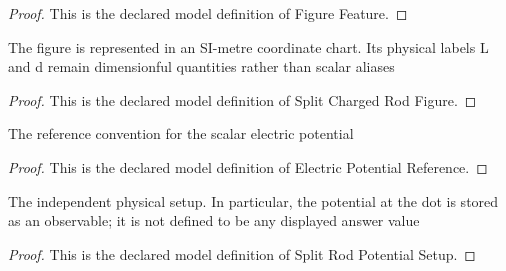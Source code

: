 \begin{proof}
  This is the declared model definition of Figure Feature.
\end{proof}
\begin{definition}
  \label{def:physics:phyx-mini-0863:phyxminiproblems-problemphyxmini0863-splitchargedrodfigure}
  The figure is represented in an SI-metre coordinate chart. Its physical labels L and d remain dimensionful quantities rather than scalar aliases
\end{definition}
\begin{proof}
  This is the declared model definition of Split Charged Rod Figure.
\end{proof}
\begin{definition}
  \label{def:physics:phyx-mini-0863:phyxminiproblems-problemphyxmini0863-electricpotentialreference}
  The reference convention for the scalar electric potential
\end{definition}
\begin{proof}
  This is the declared model definition of Electric Potential Reference.
\end{proof}
\begin{definition}
  \label{def:physics:phyx-mini-0863:phyxminiproblems-problemphyxmini0863-splitrodpotentialsetup}
  The independent physical setup. In particular, the potential at the dot is stored as an observable; it is not defined to be any displayed answer value
\end{definition}
\begin{proof}
  This is the declared model definition of Split Rod Potential Setup.
\end{proof}
